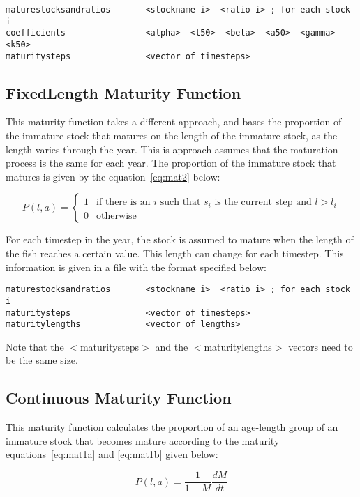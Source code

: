 \documentclass[10pt,twoside]{book}
\begin{document}
{\small\begin{verbatim}
maturestocksandratios       <stockname i>  <ratio i> ; for each stock i
coefficients                <alpha>  <l50>  <beta>  <a50>  <gamma>  <k50>
maturitysteps               <vector of timesteps>
\end{verbatim}}

\subsection{FixedLength Maturity Function}
This maturity function takes a different approach, and bases the proportion of the immature stock that matures on the length of the immature stock, as the length varies through the year.  This is approach assumes that the maturation process is the same for each year.  The proportion of the immature stock that matures is given by the equation~\ref{eq:mat2} below:

\begin{equation}\label{eq:mat2}
P(l, a) =
\begin{cases}
1 & \textrm{if there is an $i$ such that $s_i$ is the current step and $l > l_i$} \\
0 & \textrm{otherwise}
\end{cases}
\end{equation}

For each timestep in the year, the stock is assumed to mature when the length of the fish reaches a certain value.  This length can change for each timestep.  This information is given in a file with the format specified below:

{\small\begin{verbatim}
maturestocksandratios       <stockname i>  <ratio i> ; for each stock i
maturitysteps               <vector of timesteps>
maturitylengths             <vector of lengths>
\end{verbatim}}

Note that the $<$maturitysteps$>$ and the $<$maturitylengths$>$ vectors need to be the same size.

\subsection{Continuous Maturity Function}
This maturity function calculates the proportion of an age-length group of an immature stock that becomes mature according to the maturity equations~\ref{eq:mat1a} and \ref{eq:mat1b} given below:

\begin{equation}\label{eq:mat1a}
P(l, a) = {\frac{1}{1 - M}}{\frac{dM}{dt}}
\end{equation}
\end{document}
